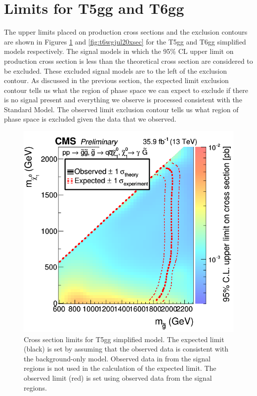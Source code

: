 \section{Limits for T5gg and T6gg}
The upper limits placed on production cross sections and the exclusion contours are shown in Figures \ref{fig:t5wgjul20xsec} and \ref{fig:t6wgjul20xsec} for the T5gg and T6gg simplified models respectively.  The signal models in which the 95\% CL upper limit on production cross section is less than the theoretical cross section are considered to be excluded.  These excluded signal models are to the left of the exclusion contour.  As discussed in the previous section, the expected limit exclusion contour tells us what the region of phase space we can expect to exclude if there is no signal present and everything we observe is processed consistent with the Standard Model.  The observed limit exclusion contour tells us what region of phase space is excluded given the data that we observed.
\begin{figure}[h]
	\centering
	\includegraphics[width=0.9\linewidth]{Figures/T5WgJul20XSEC}
	\caption[Cross section limits for T5gg simplified model.]{Cross section limits for T5gg simplified model.  The expected limit (black) is set by assuming that the observed data is consistent with the background-only model.  Observed data in from the signal regions is not used in the calculation of the expected limit.  The observed limit (red) is set using observed data from the signal regions.}
	\label{fig:t5wgjul20xsec}
\end{figure}
